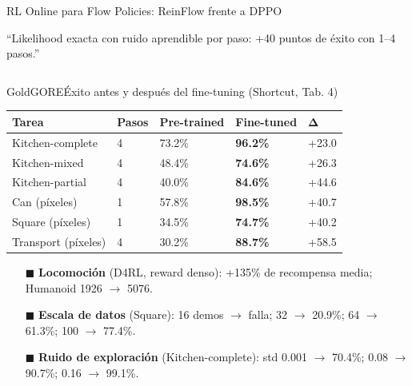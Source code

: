 \documentclass[aspectratio=169,10pt,xcolor={dvipsnames,table}]{beamer}
\newcommand{\BannerFont}{\fontsize{7.5}{9.2}\selectfont\bfseries}       %
\newcommand{\BannerArc}{1.5pt}             %
\newcommand{\BannerRule}{0.5pt}            %
\newcommand{\BannerLeftRule}{2.5pt}        %
\newcommand{\CardHeightTall}{46mm}         %
\newcommand{\BannerCentral}[2][UCNCyan]{%
  \begin{tcolorbox}[
    enhanced,
    colback=#1!10,
    colframe=#1,
    boxrule=\BannerRule,
    leftrule=\BannerLeftRule,
    arc=\BannerArc,
    top=0.35mm, bottom=0.35mm, left=2mm, right=2mm
  ]
    {\BannerFont\raggedright\textcolor{UCNBlue}{#2}\par}
  \end{tcolorbox}%
  \vspace{-2.5mm}%
}
\newcommand{\BannerRef}[1]{{\mdseries\fontsize{5}{6}\selectfont\textcolor{TextDark!65}{\cite{#1}}}} %
\newcommand{\TabFont}{\fontsize{5.3}{6.4}\selectfont}                    %
\begin{document}
\begin{frame}{RL Online para Flow Policies: ReinFlow frente a DPPO}
  \BannerCentral[GoldGORE]{``Likelihood exacta con ruido aprendible por paso: +40 puntos de éxito con 1--4 pasos.'' \BannerRef{zhang2025reinflow}}
  \vspace{0.8mm}
  \begin{columns}[T, onlytextwidth]
    \begin{column}{0.50\textwidth}
      \begin{Card}[height=\CardHeightTall]{GoldGORE}{Éxito antes y después del fine-tuning (Shortcut, Tab. 4)}
        {\TabFont
        \setlength{\tabcolsep}{1.4pt}
        \renewcommand{\arraystretch}{1.08}
        \begin{tabular}{@{}L{21mm} C{8mm} C{13mm} C{13mm} C{10mm}@{}}
          \toprule
          \textbf{Tarea} & \textbf{Pasos} & \textbf{Pre-trained} & \textbf{Fine-tuned} & $\boldsymbol{\Delta}$ \\
          \midrule
          Kitchen-complete & 4 & 73.2\% & \textbf{96.2\%} & +23.0 \\
          Kitchen-mixed & 4 & 48.4\% & \textbf{74.6\%} & +26.3 \\
          Kitchen-partial & 4 & 40.0\% & \textbf{84.6\%} & +44.6 \\
          Can (píxeles) & 1 & 57.8\% & \textbf{98.5\%} & +40.7 \\
          Square (píxeles) & 1 & 34.5\% & \textbf{74.7\%} & +40.2 \\
          Transport (píxeles) & 4 & 30.2\% & \textbf{88.7\%} & +58.5 \\
          \bottomrule
        \end{tabular}\par
        \vspace{1mm}
        \begin{itemize}\setlength{\itemsep}{0.6pt}
          \item[\textcolor{GoldGORE}{$\blacksquare$}] \textbf{Locomoción} (D4RL, reward denso): +135\% de recompensa media; Humanoid 1926 $\to$ 5076.
          \item[\textcolor{GoldGORE}{$\blacksquare$}] \textbf{Escala de datos} (Square): 16 demos $\to$ falla; 32 $\to$ 20.9\%; 64 $\to$ 61.3\%; 100 $\to$ 77.4\%.
          \item[\textcolor{GoldGORE}{$\blacksquare$}] \textbf{Ruido de exploración} (Kitchen-complete): std 0.001 $\to$ 70.4\%; 0.08 $\to$ 90.7\%; 0.16 $\to$ 99.1\%.

\end{itemize}}
\end{Card}
\end{column}
\end{columns}
\end{frame}
\end{document}
